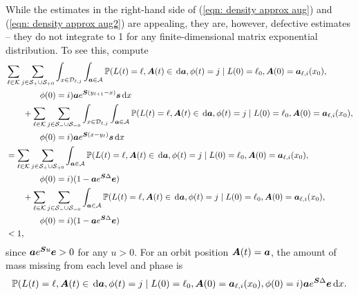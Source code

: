While the estimates in the right-hand side of (\ref{eqn: density approx aug}) and (\ref{eqn: density approx aug2}) are appealing, they are, however, defective estimates -- they do not integrate to 1 for any finite-dimensional matrix exponential distribution. To see this, compute 
\begin{align*}
	&\sum_{\ell\in\mathcal K}\sum_{j\in\mathcal S_+\cup \mathcal{S}_{+0}}\int_{x\in\mathcal D_{\ell,j}}\displaystyle\int_{\boldsymbol a \in\mathcal A}\mathbb P(L(t) = \ell, \boldsymbol A(t)\in\, \mathrm{d} \boldsymbol a, \phi(t) = j\mid L(0)=\ell_0, \boldsymbol A(0) = \boldsymbol  a_{\ell,i}(x_0), 
	\\&\qquad{}\qquad{}\phi(0) = i) \boldsymbol a e^{ \boldsymbol{S}(y_{\ell+1}-x)} \boldsymbol s \, \mathrm{d} x
	\\&\qquad{}{}+\sum_{\ell\in\mathcal K}\sum_{j\in\mathcal S_-\cup \mathcal{S}_{-0}}\int_{x\in\mathcal D_{\ell,j}}\displaystyle\int_{\boldsymbol a \in\mathcal A}\mathbb P(L(t) = \ell, \boldsymbol A(t)\in\, \mathrm{d} \boldsymbol a, \phi(t) = j\mid L(0)=\ell_0, \boldsymbol A(0) = \boldsymbol  a_{\ell,i}(x_0), 
	\\&\qquad{}\qquad{}\phi(0) = i) \boldsymbol a e^{ \boldsymbol{S}(x-y_\ell)} \boldsymbol s \, \mathrm{d} x
	\\&= \sum_{\ell\in\mathcal K}\sum_{j\in\mathcal S_+\cup \mathcal{S}_{+0}}\displaystyle\int_{\boldsymbol a \in\mathcal A}\mathbb P(L(t) = \ell, \boldsymbol A(t)\in\, \mathrm{d} \boldsymbol a, \phi(t) = j\mid L(0)=\ell_0, \boldsymbol A(0) = \boldsymbol  a_{\ell,i}(x_0), 
	\\&\qquad{}\qquad{}\phi(0) = i) (1-\boldsymbol a e^{ \boldsymbol{S}\Delta}\boldsymbol e  )
	\\&\qquad{}{}+\sum_{\ell\in\mathcal K}\sum_{j\in\mathcal S_-\cup \mathcal{S}_{-0}}\displaystyle\int_{\boldsymbol a \in\mathcal A}\mathbb P(L(t) = \ell, \boldsymbol A(t)\in\, \mathrm{d} \boldsymbol a, \phi(t) = j\mid L(0)=\ell_0, \boldsymbol A(0) = \boldsymbol  a_{\ell,i}(x_0), 
	\\&\qquad{}\qquad{}\phi(0) = i) (1-\boldsymbol a e^{ \boldsymbol{S}\Delta} \boldsymbol e )
	\\&<1,
\end{align*}
since \(\boldsymbol a e^{\boldsymbol{S}u} \boldsymbol e>0\) for any \(u>0\). For an orbit position \(\boldsymbol A(t)=\boldsymbol a\), the amount of mass missing from each level and phase is 
\[\mathbb P(L(t) = \ell, \boldsymbol A(t)\in\, \mathrm{d} \boldsymbol a,\phi(t) = j\mid L(0)=\ell_0, \boldsymbol A(0) = \boldsymbol  a_{\ell,i}(x_0), \phi(0) = i) \boldsymbol a e^{\boldsymbol{S}\Delta} \boldsymbol e \, \mathrm{d} x.\]

